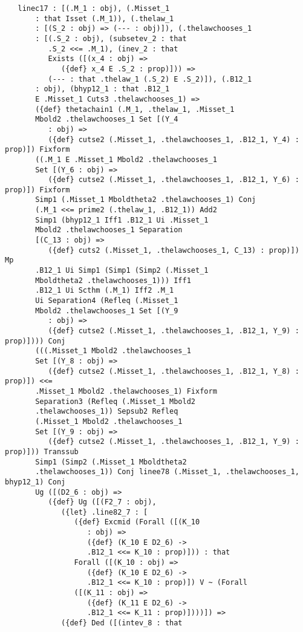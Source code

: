 \documentclass[12pt]{article}
\begin{document}
\begin{verbatim}
   linec17 : [(.M_1 : obj), (.Misset_1 
       : that Isset (.M_1)), (.thelaw_1 
       : [(S_2 : obj) => (--- : obj)]), (.thelawchooses_1 
       : [(.S_2 : obj), (subsetev_2 : that 
          .S_2 <<= .M_1), (inev_2 : that 
          Exists ([(x_4 : obj) => 
             ({def} x_4 E .S_2 : prop)])) => 
          (--- : that .thelaw_1 (.S_2) E .S_2)]), (.B12_1 
       : obj), (bhyp12_1 : that .B12_1 
       E .Misset_1 Cuts3 .thelawchooses_1) => 
       ({def} thetachain1 (.M_1, .thelaw_1, .Misset_1 
       Mbold2 .thelawchooses_1 Set [(Y_4 
          : obj) => 
          ({def} cutse2 (.Misset_1, .thelawchooses_1, .B12_1, Y_4) : prop)]) Fixform 
       ((.M_1 E .Misset_1 Mbold2 .thelawchooses_1 
       Set [(Y_6 : obj) => 
          ({def} cutse2 (.Misset_1, .thelawchooses_1, .B12_1, Y_6) : prop)]) Fixform 
       Simp1 (.Misset_1 Mboldtheta2 .thelawchooses_1) Conj 
       (.M_1 <<= prime2 (.thelaw_1, .B12_1)) Add2 
       Simp1 (bhyp12_1 Iff1 .B12_1 Ui .Misset_1 
       Mbold2 .thelawchooses_1 Separation 
       [(C_13 : obj) => 
          ({def} cuts2 (.Misset_1, .thelawchooses_1, C_13) : prop)]) Mp 
       .B12_1 Ui Simp1 (Simp1 (Simp2 (.Misset_1 
       Mboldtheta2 .thelawchooses_1))) Iff1 
       .B12_1 Ui Scthm (.M_1) Iff2 .M_1 
       Ui Separation4 (Refleq (.Misset_1 
       Mbold2 .thelawchooses_1 Set [(Y_9 
          : obj) => 
          ({def} cutse2 (.Misset_1, .thelawchooses_1, .B12_1, Y_9) : prop)]))) Conj 
       (((.Misset_1 Mbold2 .thelawchooses_1 
       Set [(Y_8 : obj) => 
          ({def} cutse2 (.Misset_1, .thelawchooses_1, .B12_1, Y_8) : prop)]) <<= 
       .Misset_1 Mbold2 .thelawchooses_1) Fixform 
       Separation3 (Refleq (.Misset_1 Mbold2 
       .thelawchooses_1)) Sepsub2 Refleq 
       (.Misset_1 Mbold2 .thelawchooses_1 
       Set [(Y_9 : obj) => 
          ({def} cutse2 (.Misset_1, .thelawchooses_1, .B12_1, Y_9) : prop)])) Transsub 
       Simp1 (Simp2 (.Misset_1 Mboldtheta2 
       .thelawchooses_1)) Conj linee78 (.Misset_1, .thelawchooses_1, bhyp12_1) Conj 
       Ug ([(D2_6 : obj) => 
          ({def} Ug ([(F2_7 : obj), 
             ({let} .line82_7 : [
                ({def} Excmid (Forall ([(K_10 
                   : obj) => 
                   ({def} (K_10 E D2_6) -> 
                   .B12_1 <<= K_10 : prop)])) : that 
                Forall ([(K_10 : obj) => 
                   ({def} (K_10 E D2_6) -> 
                   .B12_1 <<= K_10 : prop)]) V ~ (Forall 
                ([(K_11 : obj) => 
                   ({def} (K_11 E D2_6) -> 
                   .B12_1 <<= K_11 : prop)])))]) => 
             ({def} Ded ([(intev_8 : that 

\end{verbatim}
\end{document}
